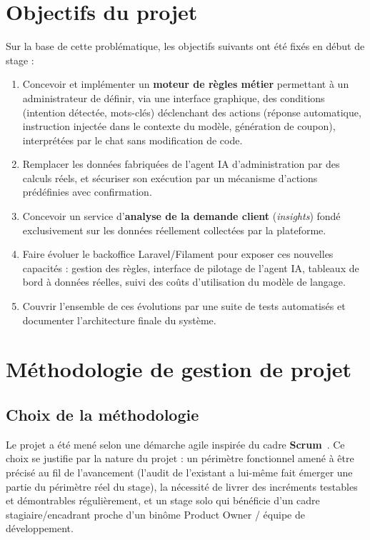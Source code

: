 \section{Objectifs du projet}

Sur la base de cette problématique, les objectifs suivants ont été fixés en début de stage :

\begin{enumerate}
    \item Concevoir et implémenter un \textbf{moteur de règles métier} permettant à un administrateur de définir, via une interface graphique, des conditions (intention détectée, mots-clés) déclenchant des actions (réponse automatique, instruction injectée dans le contexte du modèle, génération de coupon), interprétées par le chat sans modification de code.
    \item Remplacer les données fabriquées de l'agent IA d'administration par des calculs réels, et sécuriser son exécution par un mécanisme d'actions prédéfinies avec confirmation.
    \item Concevoir un service d'\textbf{analyse de la demande client} (\emph{insights}) fondé exclusivement sur les données réellement collectées par la plateforme.
    \item Faire évoluer le backoffice Laravel/Filament pour exposer ces nouvelles capacités : gestion des règles, interface de pilotage de l'agent IA, tableaux de bord à données réelles, suivi des coûts d'utilisation du modèle de langage.
    \item Couvrir l'ensemble de ces évolutions par une suite de tests automatisés et documenter l'architecture finale du système.
\end{enumerate}

\section{Méthodologie de gestion de projet}

\subsection{Choix de la méthodologie}

Le projet a été mené selon une démarche agile inspirée du cadre \textbf{Scrum}~\cite{scrumguide}. Ce choix se justifie par la nature du projet : un périmètre fonctionnel amené à être précisé au fil de l'avancement (l'audit de l'existant a lui-même fait émerger une partie du périmètre réel du stage), la nécessité de livrer des incréments testables et démontrables régulièrement, et un stage solo qui bénéficie d'un cadre stagiaire/encadrant proche d'un binôme Product Owner / équipe de développement.

